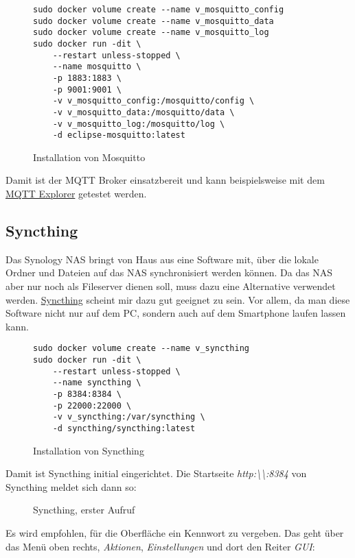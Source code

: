 \documentclass[12pt,a4paper]{article}
\newcommand{\code}[1]{\textit{#1}}
\newcommand{\jpaimg}[2]{\begin{figure}[H]\centering\fbox{\texttt{[image: \#1]}}\caption{#2}\label{fig:#2}\end{figure}}
\begin{document}
\begin{figure}[H]
\begin{lstlisting}
sudo docker volume create --name v_mosquitto_config
sudo docker volume create --name v_mosquitto_data
sudo docker volume create --name v_mosquitto_log
sudo docker run -dit \
    --restart unless-stopped \
    --name mosquitto \
    -p 1883:1883 \
    -p 9001:9001 \
    -v v_mosquitto_config:/mosquitto/config \
    -v v_mosquitto_data:/mosquitto/data \
    -v v_mosquitto_log:/mosquitto/log \
    -d eclipse-mosquitto:latest
\end{lstlisting}
\caption{Installation von Mosquitto}\label{fig:Installation von Mosquitto}
\end{figure}

Damit ist der MQTT Broker einsatzbereit und kann beispielsweise mit dem \href{https://mqtt-explorer.com/}{MQTT Explorer}
getestet werden.

\subsection{Syncthing}
Das Synology NAS bringt von Haus aus eine Software mit, über die lokale Ordner und Dateien auf das NAS synchronisiert
werden können. Da das NAS aber nur noch als Fileserver dienen soll, muss dazu eine Alternative verwendet werden.
\href{https://syncthing.net/}{Syncthing} scheint mir dazu gut geeignet zu sein. Vor allem, da man diese Software nicht
nur auf dem PC, sondern auch auf dem Smartphone laufen lassen kann.

\begin{figure}[H]
\begin{lstlisting}
sudo docker volume create --name v_syncthing
sudo docker run -dit \
    --restart unless-stopped \
    --name syncthing \
    -p 8384:8384 \
    -p 22000:22000 \
    -v v_syncthing:/var/syncthing \
    -d syncthing/syncthing:latest
\end{lstlisting}
\caption{Installation von Syncthing}\label{fig:Installation von Syncthing}
\end{figure}

Damit ist Syncthing initial eingerichtet. Die Startseite \code{http:\textbackslash\textbackslash<IP OF SERVER>:8384} von
Syncthing meldet sich dann so:

\jpaimg{./images/Syncthing-01.png}{Syncthing, erster Aufruf}

Es wird empfohlen, für die Oberfläche ein Kennwort zu vergeben. Das geht über das Menü oben rechts, \code{Aktionen},
\code{Einstellungen} und dort den Reiter \code{GUI}:
\end{document}
